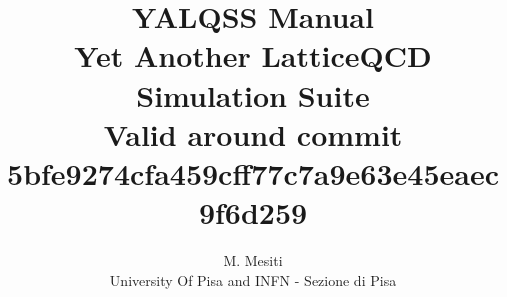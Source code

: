 \documentclass[a4paper,10pt]{scrartcl}
\title{{\Huge \bf YALQSS Manual} \\
Yet Another LatticeQCD Simulation Suite \\
{\small Valid around commit 
5bfe9274cfa459cff77c7a9e63e45eaec9f6d259
}}
\author{M. Mesiti\\{\small University Of Pisa and INFN - Sezione di Pisa}}
\begin{document}
\maketitle
\date{}
 

  

  
 
  
  
%  
\end{document}
